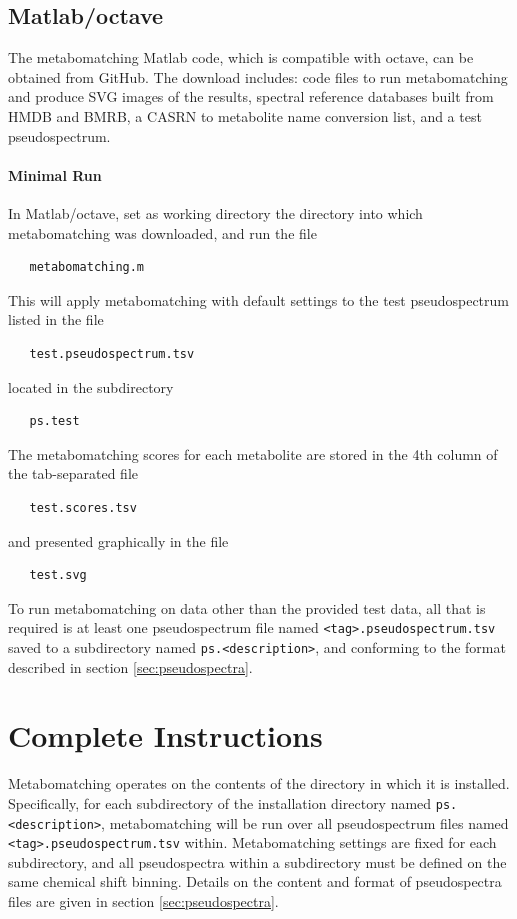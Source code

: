 \documentclass[a4paper,11pt]{article}
\begin{document}
\subsection{Matlab/octave}
The metabomatching Matlab code, which is compatible with octave, can be obtained from GitHub. The download includes: code files to run metabomatching and produce SVG images of the results, spectral reference databases built from HMDB and BMRB, a CASRN to metabolite name conversion list, and a test pseudospectrum.
\paragraph{Minimal Run} In Matlab/octave, set as working directory the directory into which metabomatching was downloaded, and run the file
\begin{verbatim}
   metabomatching.m
\end{verbatim}
This will apply metabomatching with default settings to the test pseudospectrum listed in the file
\begin{verbatim}
   test.pseudospectrum.tsv
\end{verbatim}
located in the subdirectory 
\begin{verbatim}
   ps.test
\end{verbatim}
The metabomatching scores for each metabolite are stored in the 4th column of the tab-separated file 
\begin{verbatim}
   test.scores.tsv
\end{verbatim}
and presented graphically in the file
\begin{verbatim}
   test.svg
\end{verbatim}
To run metabomatching on data other than the provided test data, all that is required is at least one pseudospectrum file named \texttt{<tag>.pseudospectrum.tsv} saved to a subdirectory named \texttt{ps.<description>}, and conforming to the format described in section \ref{sec:pseudospectra}.

\clearpage

\section{Complete Instructions}
Metabomatching operates on the contents of the directory in which it is installed. Specifically, for each subdirectory of the installation directory named \texttt{ps.<description>}, metabomatching will be run over all pseudospectrum files named \texttt{<tag>.pseudospectrum.tsv} within. Metabomatching settings are fixed for each subdirectory, and all pseudospectra within a subdirectory must be defined on the same chemical shift binning. Details on the content and format of pseudospectra files are given in section \ref{sec:pseudospectra}.
\end{document}
